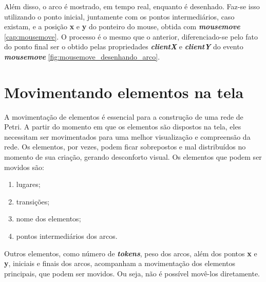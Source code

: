 \documentclass[
	12pt,				%
	openright,			%
	oneside,			%
	a4paper,			%
	english,			%
	brazil				%
	]{abntex2}
\begin{document}
Além disso, o arco é mostrado, em tempo real, enquanto é desenhado. Faz-se isso utilizando o ponto inicial, juntamente com os pontos intermediários, caso existam, e a posição \textbf{x} e \textbf{y} do ponteiro do mouse, obtida com \textbf{\textit{mousemove}} \ref{cap:mousemove}. O processo é o mesmo que o anterior, diferenciado-se pelo fato do ponto final ser o obtido pelas propriedades \textbf{\textit{clientX}} e \textbf{\textit{clientY}} do evento \textbf{\textit{mousemove}} \ref{fig:mousemove_desenhando_arco}. 

\section{Movimentando elementos na tela}\label{cap:move_elements}

A movimentação de elementos é essencial para a construção de uma rede de Petri. A partir do momento em que os elementos são dispostos na tela, eles necessitam ser movimentados para uma melhor visualização e compreensão da rede. Os elementos, por vezes, podem ficar sobrepostos e mal distribuídos no momento de sua criação, gerando desconforto visual. Os elementos que podem ser movidos são: 

\begin{enumerate}
	\item lugares;
	\item transições;
	\item nome dos elementos;
	\item pontos intermediários dos arcos.
\end{enumerate}

Outros elementos, como número de \textbf{\textit{tokens}}, peso dos arcos, além dos pontos \textbf{x} e \textbf{y}, iniciais e finais dos arcos, acompanham a movimentação dos elementos principais, que podem ser movidos. Ou seja, não é possível movê-los diretamente.
\end{document}
